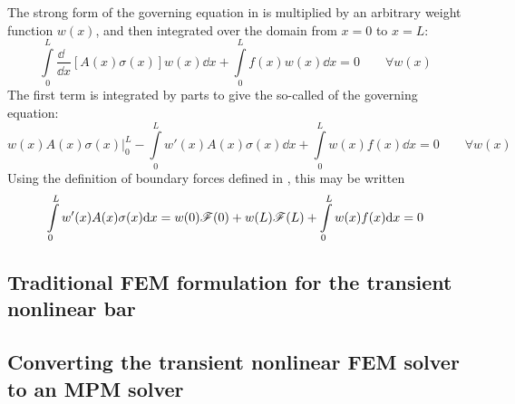 The strong form of the governing equation in  is multiplied by an arbitrary weight function  $w(x)$, and then integrated over the domain from $x=0$ to $x=L$:
\begin{equation}
  \int\limits_0^L \frac{\dd~~}{\dd x}\left[A(x) \sigma(x)\right] w(x)\dd x  +  \int\limits_0^L f(x)w(x)\dd x=0
\qquad\forall w(x)
\end{equation}
The first term is integrated by parts to give the so-called  of the governing equation:
\begin{equation}
  w(x) A(x) \sigma(x) \big|_0^L-\int\limits_0^L w'(x) A(x) \sigma(x)\dd x  +  \int\limits_0^L w(x)f(x)\dd x=0
\qquad\forall w(x)
\label{eq:nonLinearBarWeakForm}
\end{equation}
Using the definition of boundary forces defined in , this may be written
\begin{equation}
 \int\limits_0^L w'(x)A(x) \sigma(x) \mathrm{d} x = w(0)\mathscr{F}(0)+w(L)\mathscr{F}(L)  +  \int\limits_0^L w(x)f(x)\mathrm{d} x=0
\label{eq:nonLinearBarWeakFormWithForcesc}
\end{equation}






\subsection{Traditional FEM formulation for the transient nonlinear \oneD bar}
\subsection{Converting the \oneD transient nonlinear FEM solver to an MPM solver}






